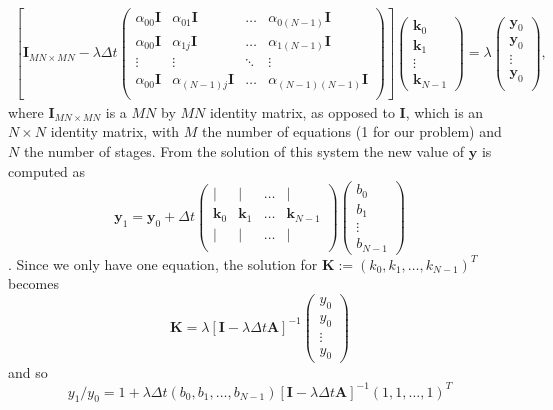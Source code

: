 \documentclass[10pt,a4paper]{article}
\newcommand{\bvec}[1]{\mathbf{#1}}
\begin{document}
\begin{align*}
  \left[ \bvec{I}_{MN\times MN} - \lambda \Delta t \begin{pmatrix}
    \alpha_{00}\bvec{I} &\alpha_{01}\bvec{I} &\hdots &\alpha_{0(N-1)}\bvec{I} \\
    \alpha_{00}\bvec{I} &\alpha_{1j}\bvec{I} &\hdots &\alpha_{1(N-1)}\bvec{I} \\
    \vdots & \vdots & \ddots & \vdots \\
    \alpha_{00}\bvec{I} &\alpha_{(N-1)j}\bvec{I} &\hdots &\alpha_{(N-1)(N-1)}\bvec{I} \\
  \end{pmatrix}\right] \begin{pmatrix} \bvec{k}_0 \\
    \bvec{k}_1 \\
    \vdots \\
    \bvec{k}_{N-1}
  \end{pmatrix} = \lambda
  \begin{pmatrix}
    \bvec{y}_0 \\
    \bvec{y}_0 \\
    \vdots \\
    \bvec{y}_0 \\
  \end{pmatrix},
\end{align*}
where $\bvec{I}_{MN\times MN}$ is a $MN$ by $MN$ identity matrix, as opposed to $\bvec{I}$, which is an $N\times N$ identity matrix, with $M$ the number of equations (1 for our problem) and $N$ the number of stages.
From the solution of this system the new value of $\bvec{y}$ is computed as
\begin{equation*}
  \bvec{y}_1 = \bvec{y}_0 + \Delta t
  \begin{pmatrix}
    \vert & \vert & \hdots & \vert \\
    \bvec{k}_0 & \bvec{k}_1 & \hdots & \bvec{k}_{N-1}\\
        \vert & \vert & \hdots & \vert \\
  \end{pmatrix}\begin{pmatrix}
    b_0 \\
    b_1 \\
    \vdots \\
    b_{N-1}
  \end{pmatrix}
\end{equation*}.
Since we only have one equation, the solution for $\bvec{K} := \left(k_0, k_1, \hdots, k_{N-1}\right)^T$ becomes
\begin{equation*}
  \bvec{K} = \lambda \left[ \bvec{I} - \lambda \Delta t \bvec{A}  \right]^{-1}
  \begin{pmatrix}
    y_0 \\
    y_0 \\
    \vdots \\
    y_0
  \end{pmatrix}
\end{equation*}
and so
\begin{equation*}
  y_1/y_0 = 1 + \lambda \Delta t \left(b_0, b_1, \hdots, b_{N-1}\right)\left[\bvec{I} - \lambda \Delta t \bvec{A}\right]^{-1}\left(1, 1, \hdots, 1\right)^T
\end{equation*}
\end{document}
